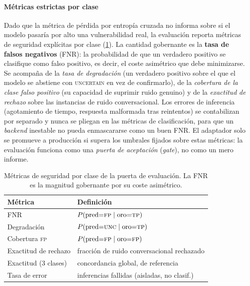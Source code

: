 \paragraph{Métricas estrictas por clase}
Dado que la métrica de pérdida por entropía cruzada no informa sobre si el
modelo pasaría por alto una vulnerabilidad real, la evaluación reporta métricas
de seguridad explícitas por clase (\cref{tab:ia-metricas}). La cantidad
gobernante es la \textbf{tasa de falsos negativos} (FNR): la probabilidad de que
un verdadero positivo se clasifique como falso positivo, es decir, el coste
asimétrico que debe minimizarse. Se acompaña de la \emph{tasa de degradación}
(un verdadero positivo sobre el que el modelo se abstiene con \textsc{uncertain}
en vez de confirmarlo), de la \emph{cobertura de la clase falso positivo} (su
capacidad de suprimir ruido genuino) y de la \emph{exactitud de rechazo} sobre
las instancias de ruido conversacional. Los errores de inferencia
(agotamiento de tiempo, respuesta malformada tras reintentos) se contabilizan
por separado y nunca se pliegan en las métricas de clasificación, para que un
\emph{backend} inestable no pueda enmascararse como un buen FNR. El adaptador
solo se promueve a producción si supera los umbrales fijados sobre estas
métricas: la evaluación funciona como una \emph{puerta de aceptación}
(\emph{gate}), no como un mero informe.

\begin{table}[t]
  \centering
  \caption{Métricas de seguridad por clase de la puerta de evaluación. La FNR
  es la magnitud gobernante por su coste asimétrico.}
  \label{tab:ia-metricas}
  \footnotesize
  \setlength{\tabcolsep}{4pt}
  \begin{tabular}{ll}
    \toprule
    Métrica & Definición \\
    \midrule
    FNR                 & $P(\text{pred}{=}\textsc{fp} \mid \text{oro}{=}\textsc{tp})$ \\
    Degradación         & $P(\text{pred}{=}\textsc{unc} \mid \text{oro}{=}\textsc{tp})$ \\
    Cobertura \textsc{fp} & $P(\text{pred}{=}\textsc{fp} \mid \text{oro}{=}\textsc{fp})$ \\
    Exactitud de rechazo & fracción de ruido conversacional rechazado \\
    Exactitud (3 clases) & concordancia global, de referencia \\
    Tasa de error        & inferencias fallidas (aisladas, no clasif.) \\
    \bottomrule
  \end{tabular}
\end{table}
